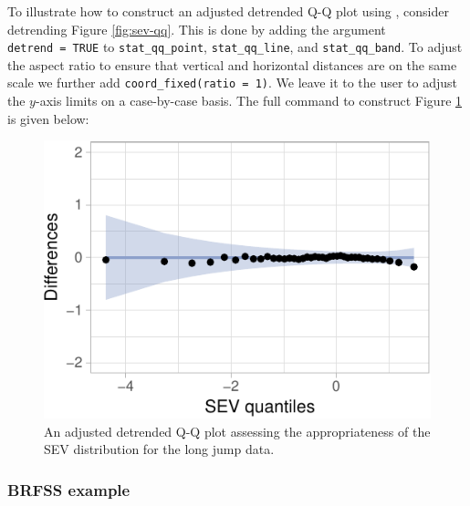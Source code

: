 \label{sec:detrending}

To illustrate how to construct an adjusted detrended Q-Q plot using
, consider detrending Figure \ref{fig:sev-qq}. This is done
by adding the argument \texttt{detrend\ =\ TRUE} to
\texttt{stat\_qq\_point}, \texttt{stat\_qq\_line}, and
\texttt{stat\_qq\_band}. To adjust the aspect ratio to ensure that
vertical and horizontal distances are on the same scale we further add
\texttt{coord\_fixed(ratio\ =\ 1)}. We leave it to the user to adjust
the \(y\)-axis limits on a case-by-case basis. The full command to
construct Figure \ref{fig:detrend-sev} is given below:

\begin{Schunk}
\begin{figure}

{\centering \includegraphics[width=0.45\linewidth]{loy-figures/detrend-sev-1} 

}

\caption[An adjusted detrended Q-Q plot assessing the appropriateness of the SEV distribution for the long jump data]{An adjusted detrended Q-Q plot assessing the appropriateness of the SEV distribution for the long jump data.}\label{fig:detrend-sev}
\end{figure}
\end{Schunk}

\subsubsection{BRFSS example}\label{brfss-example}


